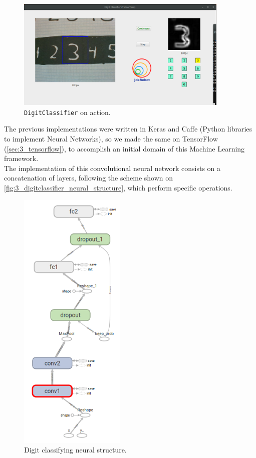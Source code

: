 		\begin{figure}[h]
			\centering
			\includegraphics[width=4in]{images/digitclassifier}
			\caption{\texttt{DigitClassifier} on action.}
			\label{fig:3_digitclassifier}
		\end{figure}
		
		The previous implementations were written in Keras and Caffe (Python libraries to implement Neural Networks), so we made the same on TensorFlow (\autoref{sec:3_tensorflow}), to accomplish an initial domain of this Machine Learning framework.\\
		
		The implementation of this convolutional neural network consists on a concatenation of layers, following the scheme shown on \autoref{fig:3_digitclassifier_neural_structure}, which perform specific operations.
		
		\begin{figure}[h]
			\centering
			\includegraphics[width=2in]{images/digitclassifier_network_graph}
			\caption{Digit classifying neural structure.}
			\label{fig:3_digitclassifier_neural_structure}
		\end{figure}



